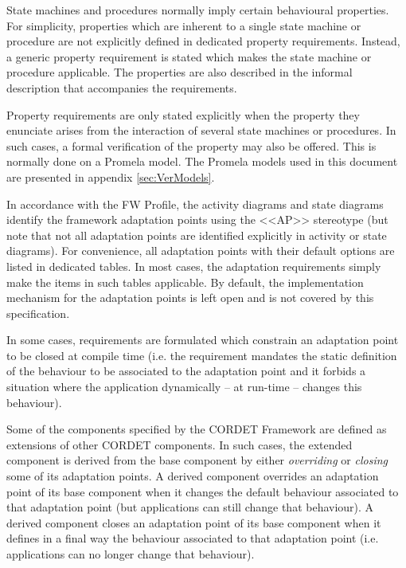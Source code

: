 \documentclass{pnp_article}
\begin{document}
State machines and procedures normally imply certain behavioural properties. 
For simplicity, properties which are inherent to a single state machine or procedure are not explicitly defined in dedicated property requirements. 
Instead, a generic property requirement is stated which makes the state machine or procedure applicable. 
The properties are also described in the informal description that accompanies the requirements.

Property requirements are only stated explicitly when the property they enunciate arises from the interaction of several state machines or procedures. 
In such cases, a formal verification of the property may also be offered. 
This is normally done on a Promela model. 
The Promela models used in this document are presented in appendix \ref{sec:VerModels}.

In accordance with the FW Profile, the activity diagrams and state diagrams identify the framework adaptation points using the <<AP>> stereotype (but note that not all adaptation points are identified explicitly in activity or state diagrams). 
For convenience, all adaptation points with their default options are listed in dedicated tables. 
In most cases, the adaptation requirements simply make the items in such tables applicable. By default, the implementation mechanism for the adaptation points is left open and is not covered by this specification. 

In some cases, requirements are formulated which constrain an adaptation point to be closed at compile time (i.e. the requirement mandates the static definition of the behaviour to be associated to the adaptation point and it forbids a situation where the application dynamically – at run-time – changes this behaviour). 
 
Some of the components specified by the CORDET Framework are defined as extensions of other CORDET components. 
In such cases, the extended component is derived from the base component by either \textit{overriding} or \textit{closing} some of its adaptation points. 
A derived component overrides an adaptation point of its base component when it changes the default behaviour associated to that adaptation point (but applications can still change that behaviour). 
A derived component closes an adaptation point of its base component when it defines in a final way the behaviour associated to that adaptation point (i.e. applications can no longer change that behaviour).

\end{document}
